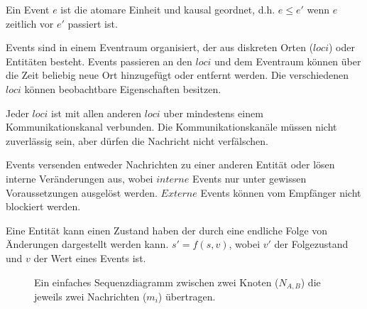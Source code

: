 \begin{defi}
  Ein Event $e$ ist die atomare Einheit und kausal geordnet, d.h.
  $e\le e'$ wenn $e$ zeitlich vor $e'$ passiert ist.
\end{defi}

Events sind in einem Eventraum organisiert, der aus diskreten Orten ($loci$)
oder Entitäten besteht. Events passieren an den $loci$ und dem Eventraum
können über die Zeit beliebig neue Ort hinzugefügt oder entfernt werden.
Die verschiedenen $loci$ können beobachtbare Eigenschaften besitzen.~\cite{bickford2005causal}

\begin{defi}
  Jeder $loci$ ist mit allen anderen $loci$ uber mindestens einem
  Kommunikationskanal verbunden. Die Kommunikationskanäle müssen
  nicht zuverlässig sein, aber dürfen die Nachricht nicht verfälschen.
\end{defi}

Events versenden entweder Nachrichten zu einer anderen Entität oder
lösen interne Veränderungen aus, wobei $interne$ Events nur unter
gewissen Voraussetzungen ausgelöst werden. $Externe$ Events
können vom Empfänger nicht blockiert werden.~\cite{bickford2005causal}

\begin{defi}
  Eine Entität kann einen Zustand haben der durch eine endliche Folge
  von Änderungen dargestellt werden kann. $s'=f(s,v)$, wobei
  $v'$ der Folgezustand und $v$ der Wert eines Events ist.  
\end{defi}



\begin{figure}
  \center
  \label{fig:sequence}
  \caption{Ein einfaches Sequenzdiagramm zwischen zwei Knoten ($N_{A,B}$) die jeweils
    zwei Nachrichten ($m_i$) übertragen.}
\end{figure}


